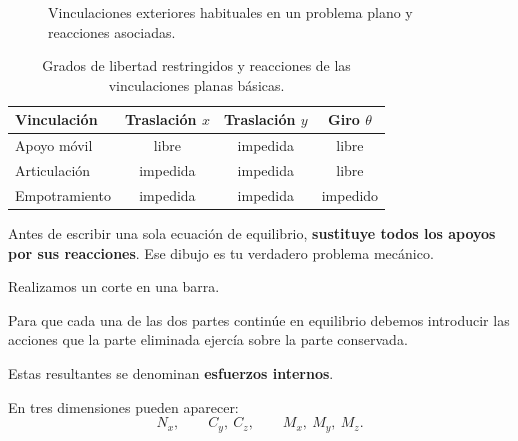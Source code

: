 \begin{figure}[htbp]
\caption{Vinculaciones exteriores habituales en un problema plano y reacciones asociadas.}
\label{fig:vinculaciones-planas}
\end{figure}

\begin{table}[htbp]
\centering
\caption{Grados de libertad restringidos y reacciones de las vinculaciones planas básicas.}
\label{tab:vinculaciones-planas}
\begin{tabular}{lccc}
\toprule
Vinculación & Traslación $x$ & Traslación $y$ & Giro $\theta$\\
\midrule
Apoyo móvil & libre & impedida & libre\\
Articulación & impedida & impedida & libre\\
Empotramiento & impedida & impedida & impedido\\
\bottomrule
\end{tabular}
\end{table}

\begin{tip}
Antes de escribir una sola ecuación de equilibrio, \textbf{sustituye todos los apoyos por sus reacciones}. Ese dibujo es tu verdadero problema mecánico.
\end{tip}


Realizamos un corte en una barra.

Para que cada una de las dos partes continúe en equilibrio debemos introducir las acciones que la parte eliminada ejercía sobre la parte conservada.

Estas resultantes se denominan \textbf{esfuerzos internos}.

En tres dimensiones pueden aparecer:
\[
N_x,\qquad C_y,\ C_z,\qquad M_x,\ M_y,\ M_z.
\]

